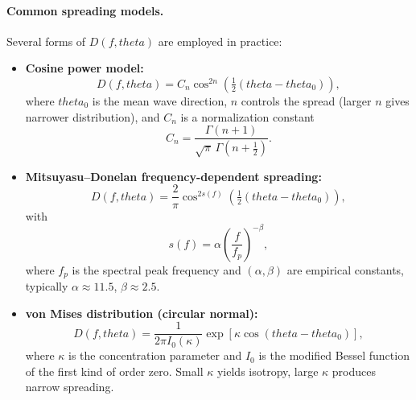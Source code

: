 \documentclass[journal,10pt,twocolumn]{IEEEtran}
\def\theta{theta}%
\begin{document}
    \paragraph{Common spreading models.}
    Several forms of $D(f,\theta)$ are employed in practice:
    \begin{itemize}[leftmargin=1.4em]
        \item \textbf{Cosine power model:}
        \begin{equation}
            D(f,\theta) = C_n \cos^{2n}\!\left(\tfrac{1}{2}(\theta - \theta_0)\right),
        \end{equation}
        where $\theta_0$ is the mean wave direction, $n$ controls the spread (larger $n$ gives narrower distribution), and $C_n$ is a normalization constant
        \begin{equation}
            C_n = \frac{\Gamma(n+1)}{\sqrt{\pi}\,\Gamma\!\left(n+\tfrac{1}{2}\right)}.
        \end{equation}

        \item \textbf{Mitsuyasu--Donelan frequency-dependent spreading:}
        \begin{equation}
            D(f,\theta) = \frac{2}{\pi} \cos^{2s(f)}\!\left(\tfrac{1}{2}(\theta - \theta_0)\right),
        \end{equation}
        with
        \begin{equation}
            s(f) = \alpha \left(\frac{f}{f_p}\right)^{-\beta},
        \end{equation}
        where $f_p$ is the spectral peak frequency and $(\alpha,\beta)$ are empirical constants, typically $\alpha \approx 11.5$, $\beta \approx 2.5$.

        \item \textbf{von Mises distribution (circular normal):}
        \begin{equation}
            D(f,\theta) = \frac{1}{2\pi I_0(\kappa)} \exp\!\left[\kappa \cos(\theta - \theta_0)\right],
        \end{equation}
        where $\kappa$ is the concentration parameter and $I_0$ is the modified Bessel function of the first kind of order zero. Small $\kappa$ yields isotropy, large $\kappa$ produces narrow spreading.
    \end{itemize}
\end{document}
